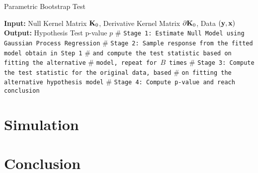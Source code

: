 \documentclass[11pt]{article}
\begin{document}
\begin{algorithm}
\caption{Parametric Bootstrap Test} 
\label{alg:cvek}
\begin{algorithmic}[1]
\newline
\textbf{Input:} Null Kernel Matrix ${\bf K}_0$, Derivative Kernel Matrix $\partial {\bf K}_0$, Data $({\bf y}, {\bf x})$\newline
\textbf{Output:} Hypothesis Test p-value $p$\newline
$\#$ \texttt{Stage 1: Estimate Null Model using Gaussian Process Regression}
\newline
$\#$ \texttt{Stage 2: Sample response from the fitted model obtain in Step 1}
\newline
$\#$ \texttt{and compute the test statistic based on fitting the alternative}
\newline
$\#$ \texttt{model, repeat for $B$ times}
\EndFor 
\newline
$\#$ \texttt{Stage 3: Compute the test statistic for the original data, based}
\newline
$\#$ \texttt{on fitting the alternative hypothesis model}
\newline
$\#$ \texttt{Stage 4: Compute p-value and reach conclusion}
\EndProcedure
\end{algorithmic}
\end{algorithm}


\section{{\bf Simulation}}
\section{{\bf Conclusion}}












\clearpage



\end{document}
